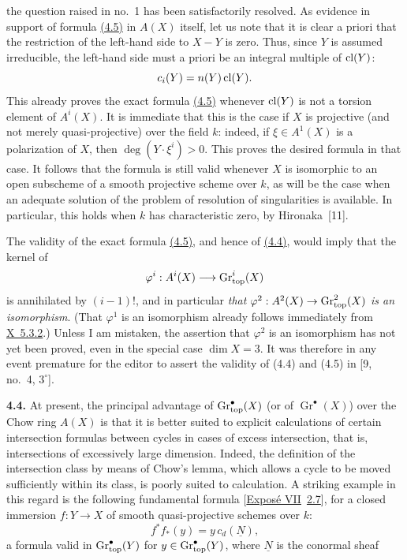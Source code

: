 the question raised in no.~1 has been satisfactorily resolved. As evidence
in support of formula \hyperlink{sga6.e14.eq.4-5}{(4.5)} in $A(X)$ itself, let us note that it is clear a
priori that the restriction of the left-hand side to $X-Y$ is zero. Thus,
since $Y$ is assumed irreducible, the left-hand side must a priori be an
integral multiple of $\operatorname{cl}(Y)$:
\[
 c_i(Y)=n(Y)\operatorname{cl}(Y).
\]
This already proves the exact formula \hyperlink{sga6.e14.eq.4-5}{(4.5)} whenever $\operatorname{cl}(Y)$ is not a
torsion element of $A^i(X)$. It is immediate that this is the case if $X$ is
projective (and not merely quasi-projective) over the field $k$: indeed, if
$\xi\in A^1(X)$ is a polarization of $X$, then
$\deg(Y\mathbin{\cdot}\xi^i)>0$. This proves the desired formula in that
case. It follows that the formula is still valid whenever $X$ is isomorphic
to an open subscheme of a smooth projective scheme over $k$, as will be the
case when an adequate solution of the problem of resolution of
singularities is available. In particular, this holds when $k$ has
characteristic zero, by Hironaka~[11].

The validity of the exact formula \hyperlink{sga6.e14.eq.4-5}{(4.5)}, and hence of \hyperlink{sga6.e14.eq.4-4}{(4.4)}, would imply that
the kernel of
\[
 \varphi^i:A^i(X)\longrightarrow\operatorname{Gr}_{\mathrm{top}}^i(X)
\]
is annihilated by $(i-1)!$, and in particular \emph{that
$\varphi^2:A^2(X)\to\operatorname{Gr}_{\mathrm{top}}^2(X)$ is an isomorphism}. (That $\varphi^1$ is an
isomorphism already follows immediately from \hyperlink{sga6.e10.thm.5-3-2}{X~5.3.2}.) Unless I am
mistaken, the assertion that $\varphi^2$ is an isomorphism has not yet been
proved, even in the special case $\dim X=3$. It was therefore in any event
premature for the editor to assert the validity of (4.4) and (4.5) in
[9, no.~4, $3^\circ$].

\noindent{}\textbf{4.4.}
At present, the principal advantage of $\operatorname{Gr}_{\mathrm{top}}^\bullet(X)$ (or of
$\operatorname{Gr}^\bullet(X)$) over the Chow ring $A(X)$ is that it is
better suited to explicit calculations of certain intersection formulas
between cycles in cases of excess intersection, that is, intersections of
excessively large dimension. Indeed, the definition of the intersection
class by means of Chow's lemma, which allows a cycle to be moved sufficiently
within its class, is poorly suited to calculation. A striking example in
this regard is the following fundamental formula [\hyperlink{sga6.e07.expose}{Exposé VII}~\hyperlink{sga6.e07.para.2-6}{2.7}], for a
closed immersion $f:Y\to X$ of smooth quasi-projective schemes over $k$:
\begin{equation*}\tag{4.6}
 f^*f_*(y)=y\,c_d(\underline{N}),
\end{equation*}
a formula valid in $\operatorname{Gr}_{\mathrm{top}}^\bullet(Y)$ for $y\in\operatorname{Gr}_{\mathrm{top}}^\bullet(Y)$, where
$\underline{N}$ is the conormal sheaf

